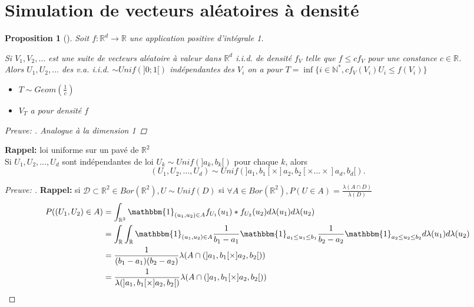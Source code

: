 \documentclass{article}
\theoremstyle{plain}%
\newtheorem{prop}[thm]{Proposition}
\theoremstyle{definition}
\theoremstyle{remark}
\begin{document}
\section{Simulation de vecteurs aléatoires à densité}
\begin{prop}[]
	Soit $ f: \mathbb{R}^d \to \mathbb{R} $ une application positive d'intégrale 1. 

	Si $ V_1, V_2, \dots $ est une suite de vecteurs aléatoire à valeur dans $ \mathbb{R}^d $ i.i.d. de densité $ f_V $ telle que $ f \leq cf_V $ pour une constance $ c \in \mathbb{R} $. \\
	Alors $ U_1, U_2, \dots $ des v.a. i.i.d. $ \sim Unif(]0;1[) $ indépendantes des $ V_i $ on a pour $ T = \inf \{i \in \mathbb{N}^*, c f_V(V_i)U_i \leq f(V_i)\} $ 
	\begin{itemize}
		\item $ T \sim Geom(\frac{1}{c}) $ 
		\item $ V_T $ a pour densité $ f $ 
	\end{itemize}
	\begin{proof}[Preuve: ]
		Analogue à la dimension 1
	\end{proof}    
\end{prop}
\textbf{Rappel:} loi uniforme sur un pavé de $ \mathbb{R}^2 $ \\ 
Si $ U_1,U_2, \dots, U_d $ sont indépendantes de loi $ U_k \sim Unif(]a_k,b_k[) $ pour chaque $ k $, alors 
\[
	(U_1, U_2,\dots,U_d) \sim Unif(]a_1,b_1[ \times ]a_2,b_2[ \times \dots \times ]a_d, b_d[)
.\]
\begin{proof}[Preuve: ]
	\textbf{Rappel:} si $ \mathcal{D} \subset \mathbb{R}^2 \in Bor(\mathbb{R}^2), U \sim Unif(D) $ si $ \forall A \in Bor(\mathbb{R}^2), P(U \in A) = \frac{\lambda (A \cap D)}{\lambda (D)} $ 
	\begin{align*}
		P((U_1, U_2) \in A) &= \int_{\mathbb{R}^2}^{}\mathbbm{1}_{(u_1,u_2) \in A} f_{U_1}(u_1) * f_{U_2}(u_2) d \lambda (u_1) d \lambda (u_2) \\
							&= \int_{\mathbb{R}} \int_{\mathbb{R}}^{} \mathbbm{1}_{(u_1,u_2) \in A} \frac{1}{b_1 - a_1} \mathbbm{1}_{a_1 \leq u_1 \leq b_1} \frac{1}{b_2 - a_2} \mathbbm{1}_{a_2 \leq u_2 \leq b_2} d \lambda (u_1) d \lambda (u_2) \\
							&= \frac{1}{(b_1-a_1)(b_2-a_2)} \lambda (A \cap (]a_1,b_1[ \times ]a_2,b_2[)) \\
							&= \frac{1}{\lambda (]a_1,b_1[ \times ]a_2,b_2[)} \lambda (A \cap (]a_1,b_1[ \times ]a_2,b_2[)) 
	\end{align*}
\end{proof}
\end{document}
